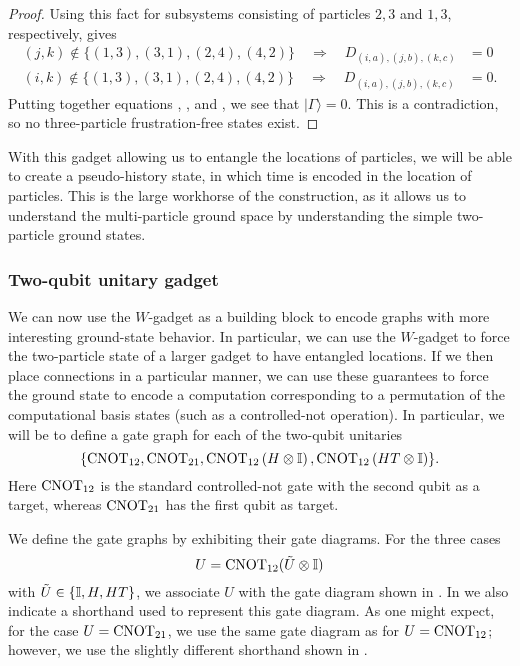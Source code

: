 \documentclass[../thesis-main/thesis-main]{subfiles}
\begin{document}
\begin{proof}
Using this fact for subsystems consisting of particles $2,3$ and $1,3$, respectively, gives 
\begin{align}
(j,k)\notin\{(1,3),(3,1),(2,4),(4,2)\}\quad\Longrightarrow\quad D_{(i,a),(j,b),(k,c)} & =0\label{eq:ij_constraint2}\\
(i,k)\notin\{(1,3),(3,1),(2,4),(4,2)\}\quad\Longrightarrow\quad D_{(i,a),(j,b),(k,c)} & =0.\label{eq:ij_constraint3}
\end{align}
Putting together equations , , and , we see that $|\Gamma\rangle=0$. This is a contradiction, so no three-particle frustration-free states exist.
\end{proof}

With this gadget allowing us to entangle the locations of particles, we will be able to create a pseudo-history state, in which time is encoded in the location of particles.  This is the large workhorse of the construction, as it allows us to understand the multi-particle ground space by understanding the simple two-particle ground states.



\subsubsection{Two-qubit unitary gadget}

We can now use the $W$-gadget as a building block to encode graphs with more interesting ground-state behavior.  In particular, we can use the $W$-gadget to force the two-particle state of a larger gadget to have entangled locations.  If we then place connections in a particular manner, we can use these guarantees to force the ground state to encode a computation corresponding to a permutation of the computational basis states (such as a controlled-not operation).  In particular, we will be to define a gate graph for each of the two-qubit unitaries
\begin{equation}
  \{\mathrm{CNOT}_{12}, \mathrm{CNOT}_{21}, \mathrm{CNOT}_{12}\left(H\otimes\mathbb{I}\right),
    \mathrm{CNOT}_{12}\left(HT\otimes\mathbb{I}\right)\}.
\end{equation}
Here $\mathrm{CNOT}_{12}$ is the standard controlled-not gate with the second qubit as a target, whereas $\mathrm{CNOT}_{21}$ has the first qubit as target.

We define the gate graphs by exhibiting their gate diagrams. For the three cases
\begin{equation}
  U=\mathrm{CNOT}_{12}(\tilde U\otimes\mathbb{I})
\end{equation}
with $\tilde U\in\{\mathbb{I},H,HT\}$, we associate $U$ with the gate diagram shown in . In  we also indicate a shorthand used to represent this gate diagram. As one might expect, for the case $U=\mathrm{CNOT}_{21}$, we use the same gate diagram as for $U=\mathrm{CNOT}_{12}$; however, we use the slightly different shorthand shown in .
\end{document}
